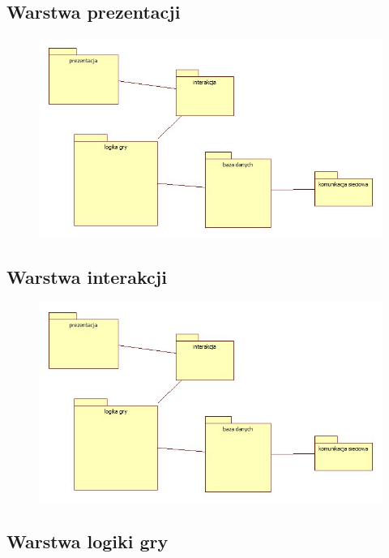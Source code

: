 \documentclass[a4paper, 11pt]{article}
\begin{document}
	\subsection{Warstwa prezentacji}	
	\begin{figure}[H]%
		\includegraphics[scale=0.5]{uml/main.jpg}
	\end{figure}
	\subsection{Warstwa interakcji}
	\begin{figure}[H]%
		\includegraphics[scale=0.5]{uml/main.jpg}
	\end{figure}	
	\subsection{Warstwa logiki gry}	
	\begin{figure}[H]%
	\end{figure}
\end{document}

